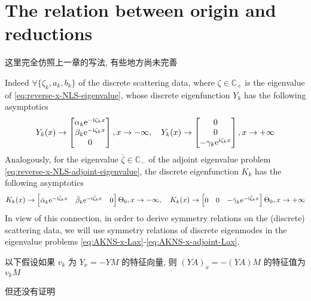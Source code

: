\section{The relation between origin and reductions}
\begin{note}
    这里完全仿照上一章的写法, 有些地方尚未完善
\end{note}
Indeed $ \forall \{ \zeta_{k}, a_{k}, b_{k} \} $ of the discrete scattering data, where $ \zeta \in \mathbb{C_{+}} $ is the eigenvalue of \eqref{eq:reverse-x-NLS-eigenvalue}, whose discrete eigenfunction $ Y_{k} $ has the following asymptotics 
\begin{equation}
    Y_{k}(x) \to \begin{bmatrix} \alpha_{k} \mathrm{e}^{-\mathrm{i} \zeta_{k} x} \\ \beta_{k} \mathrm{e}^{-\mathrm{i} \zeta_{k} x} \\ 0 \end{bmatrix}, x \to -\infty, 
    \quad 
    Y_{k}(x) \to \begin{bmatrix} 0 \\0 \\ -\gamma_{k} \mathrm{e}^{\mathrm{i} \zeta_{k} x} \end{bmatrix}, x \to +\infty \label{eq:large-x-asymptotics-of-reverse-x-3d-NLS-eigenfunction}
\end{equation}
Analogously, for the eigenvalue $ \bar{\zeta} \in \mathbb{C_{-}} $ of the adjoint eigenvalue problem \eqref{eq:reverse-x-NLS-adjoint-eigenvalue}, the discrete eigenfunction $ K_{k} $ has the following asymptotics 
\begin{equation}
    K_{k}(x) \to \begin{bmatrix} \bar{\alpha}_{k} \mathrm{e}^{-\mathrm{i} \bar{\zeta}_{k} x} &\bar{\beta}_{k} \mathrm{e}^{-\mathrm{i} \bar{\zeta}_{k} x} & 0 \end{bmatrix}\Theta_{0}, x \to -\infty, 
    \quad 
    K_{k}(x) \to \begin{bmatrix} 0 & 0 & -\bar{\gamma}_{k}\mathrm{e}^{-\mathrm{i} \bar{\zeta}_{k}x} \end{bmatrix}\Theta_{0}, x \to +\infty \label{eq:large-x-asymptotics-of-reverse-x-3d-NLS-adjoint-eigenfunction}
\end{equation}
In view of this connection, in order to derive symmetry relations on the (discrete) scattering data, we will use symmetry relations of discrete eigenmodes in the eigenvalue problems \eqref{eq:AKNS-x-Lax}-\eqref{eq:AKNS-x-adjoint-Lax}.
\begin{note}
    以下假设如果 $ v_{k} $ 为 $ Y_{x} = -YM $ 的特征向量, 则 $ (YA)_{x} = -(YA)M $ 的特征值为 $ v_{k}M $ 

    但还没有证明
\end{note}
